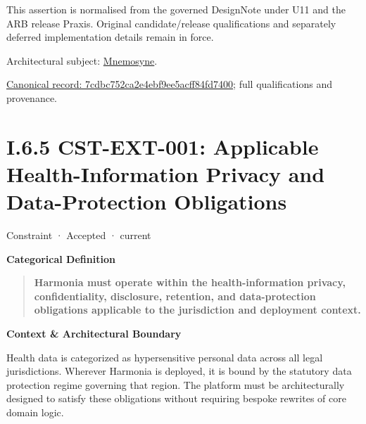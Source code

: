 This assertion is normalised from the governed DesignNote under U11 and the ARB release Praxis. Original candidate/release qualifications and separately deferred implementation details remain in force.



Architectural subject: \hyperref[element:7985e647bf9e4ca3ba70faf9e3e4ae02]{Mnemosyne}.


{\footnotesize \href{../../../../continuum/motivation/constraint/7cdbc752ca2e4ebf9ee5acff84fd7400.md}{Canonical record: 7cdbc752ca2e4ebf9ee5acff84fd7400}; full qualifications and provenance.}\par
\section*{I.6.5 CST-EXT-001: Applicable Health-Information Privacy and Data-Protection Obligations}
\label{navigation:I.6.5}

\label{element:0ed6fb9fcc9547659ce76b917881274e}
{\small Constraint · Accepted · current}\par

\par\medskip\textbf{Categorical Definition}\par


\begin{quote}


\textbf{Harmonia must operate within the health-information privacy, confidentiality, disclosure, retention, and data-protection obligations applicable to the jurisdiction and deployment context.}



\end{quote}


\par\medskip\textbf{Context \& Architectural Boundary}\par


Health data is categorized as hypersensitive personal data across all legal jurisdictions. Wherever Harmonia is deployed, it is bound by the statutory data protection regime governing that region. The platform must be architecturally designed to satisfy these obligations without requiring bespoke rewrites of core domain logic.



